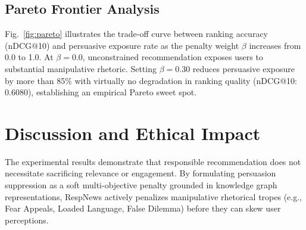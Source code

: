 \documentclass[conference]{IEEEtran}
\begin{document}
\begin{table}[t]
\caption{Ablation results on component contributions.}
\label{tab:ablation}
\centering
\small
{}
\end{table}

\subsection{Pareto Frontier Analysis}
Fig.~\ref{fig:pareto} illustrates the trade-off curve between ranking accuracy (nDCG@10) and persuasive exposure rate as the penalty weight $\beta$ increases from 0.0 to 1.0. At $\beta=0.0$, unconstrained recommendation exposes users to substantial manipulative rhetoric. Setting $\beta=0.30$ reduces persuasive exposure by more than 85\% with virtually no degradation in ranking quality (nDCG@10: 0.6080), establishing an empirical Pareto sweet spot.

\section{Discussion and Ethical Impact}
The experimental results demonstrate that responsible recommendation does not necessitate sacrificing relevance or engagement. By formulating persuasion suppression as a soft multi-objective penalty grounded in knowledge graph representations, RespNews actively penalizes manipulative rhetorical tropes (e.g., Fear Appeals, Loaded Language, False Dilemma) before they can skew user perceptions. 
\end{document}

